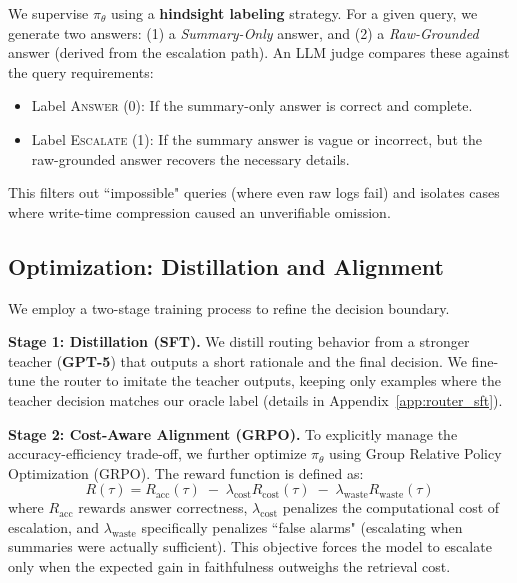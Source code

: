 \documentclass{article}
\theoremstyle{plain}
\theoremstyle{definition}
\theoremstyle{remark}
\begin{document}
We supervise $\pi_\theta$ using a \textbf{hindsight labeling} strategy.
For a given query, we generate two answers: (1) a \emph{Summary-Only} answer, and (2) a \emph{Raw-Grounded} answer (derived from the escalation path).
An LLM judge compares these against the query requirements:
\begin{itemize}
    \item Label \textsc{Answer} (0): If the summary-only answer is correct and complete.
    \item Label \textsc{Escalate} (1): If the summary answer is vague or incorrect, but the raw-grounded answer recovers the necessary details.
\end{itemize}
This filters out ``impossible" queries (where even raw logs fail) and isolates cases where write-time compression caused an unverifiable omission.

\subsection{Optimization: Distillation and Alignment}
\label{sec:opt_train}

We employ a two-stage training process to refine the decision boundary.

\vspace{0.25em}
\noindent\textbf{Stage 1: Distillation (SFT).}
We distill routing behavior from a stronger teacher (\textbf{GPT-5}) that outputs a short rationale and the final decision. We fine-tune the router to imitate the teacher outputs, keeping only examples where the teacher decision matches our oracle label (details in Appendix~\ref{app:router_sft}).

\vspace{0.25em}
\noindent\textbf{Stage 2: Cost-Aware Alignment (GRPO).}
To explicitly manage the accuracy-efficiency trade-off, we further optimize $\pi_\theta$ using Group Relative Policy Optimization (GRPO). The reward function is defined as:
\begin{equation*} R(\tau) = R_{\mathrm{acc}}(\tau)\;-\;\lambda_{\mathrm{cost}} R_{\mathrm{cost}}(\tau)\;-\;\lambda_{\mathrm{waste}} R_{\mathrm{waste}}(\tau) \label{eq:reward} \end{equation*} 
where $R_{\mathrm{acc}}$ rewards answer correctness, $\lambda_{\mathrm{cost}}$ penalizes the computational cost of escalation, and $\lambda_{\mathrm{waste}}$ specifically penalizes ``false alarms" (escalating when summaries were actually sufficient).
This objective forces the model to escalate only when the expected gain in faithfulness outweighs the retrieval cost.
\end{document}
